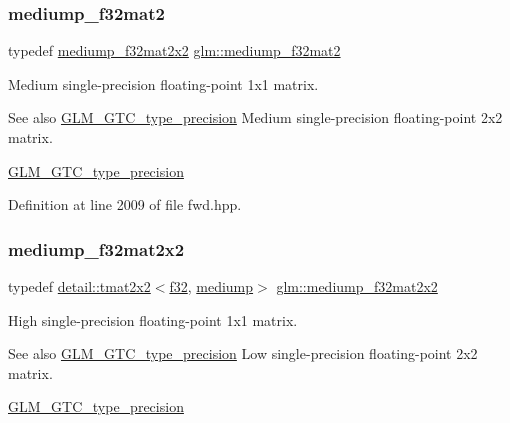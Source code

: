 \subsubsection{\texorpdfstring{mediump\+\_\+f32mat2}{mediump\_f32mat2}}
{\footnotesize\ttfamily typedef \hyperlink{group__gtc__type__precision_ga23c9239d6aa9b41c3d2145e2faa81edb}{mediump\+\_\+f32mat2x2} \hyperlink{group__gtc__type__precision_ga103735a38477f7c389b36aae0fbdf274}{glm\+::mediump\+\_\+f32mat2}}

Medium single-\/precision floating-\/point 1x1 matrix. \begin{DoxySeeAlso}{See also}
\hyperlink{group__gtc__type__precision}{G\+L\+M\+\_\+\+G\+T\+C\+\_\+type\+\_\+precision} Medium single-\/precision floating-\/point 2x2 matrix. 

\hyperlink{group__gtc__type__precision}{G\+L\+M\+\_\+\+G\+T\+C\+\_\+type\+\_\+precision} 
\end{DoxySeeAlso}


Definition at line 2009 of file fwd.\+hpp.

\mbox{\label{group__gtc__type__precision_ga23c9239d6aa9b41c3d2145e2faa81edb}} 
\subsubsection{\texorpdfstring{mediump\+\_\+f32mat2x2}{mediump\_f32mat2x2}}
{\footnotesize\ttfamily typedef \hyperlink{structglm_1_1detail_1_1tmat2x2}{detail\+::tmat2x2}$<$\hyperlink{group__gtc__type__precision_ga0ec999b57f5330d9021256e96038df04}{f32}, \hyperlink{namespaceglm_a0f04f086094c747d227af4425893f545a6416f3ea0c9025fb21ed50c4d6620482}{mediump}$>$ \hyperlink{group__gtc__type__precision_ga23c9239d6aa9b41c3d2145e2faa81edb}{glm\+::mediump\+\_\+f32mat2x2}}

High single-\/precision floating-\/point 1x1 matrix. \begin{DoxySeeAlso}{See also}
\hyperlink{group__gtc__type__precision}{G\+L\+M\+\_\+\+G\+T\+C\+\_\+type\+\_\+precision} Low single-\/precision floating-\/point 2x2 matrix. 

\hyperlink{group__gtc__type__precision}{G\+L\+M\+\_\+\+G\+T\+C\+\_\+type\+\_\+precision} 
\end{DoxySeeAlso}


